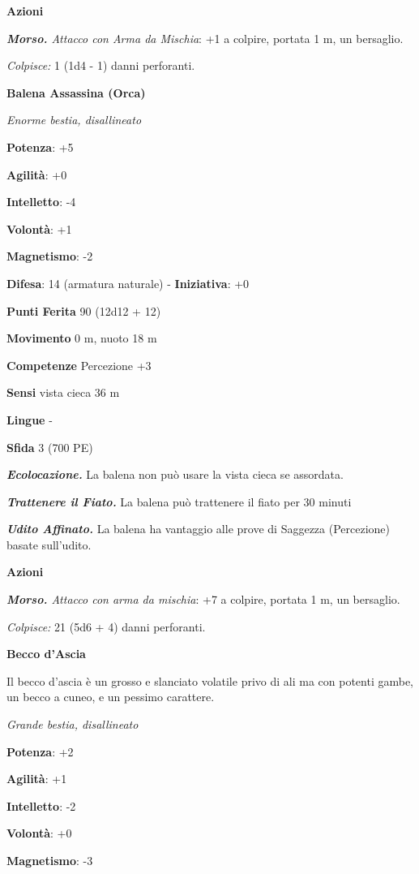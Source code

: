 \begin{multicols}{2}
\smallskip\textbf{Azioni}

\emph{\textbf{Morso.} Attacco con Arma da Mischia}: +1 a colpire,
portata 1 m, un bersaglio.

\emph{Colpisce:} 1 (1d4 - 1) danni perforanti.



\textbf{Balena Assassina (Orca)}

\emph{Enorme bestia, disallineato}

\textbf{Potenza}: +5

\textbf{Agilità}: +0

\textbf{Intelletto}: -4

\textbf{Volontà}: +1

\textbf{Magnetismo}: -2

\textbf{Difesa}: 14 (armatura naturale) - \textbf{Iniziativa}: +0

\textbf{Punti Ferita} 90 (12d12 + 12)

\textbf{Movimento} 0 m, nuoto 18 m

\textbf{Competenze} Percezione +3

\textbf{Sensi} vista cieca 36 m

\textbf{Lingue} -

\textbf{Sfida} 3 (700 PE)\smallskip

\emph{\textbf{Ecolocazione.}} La balena non può usare la vista cieca se
assordata.

\emph{\textbf{Trattenere il Fiato.}} La balena può trattenere il fiato
per 30 minuti

\emph{\textbf{Udito Affinato.}} La balena ha vantaggio alle prove di
Saggezza (Percezione) basate sull'udito.

\smallskip\textbf{Azioni}

\emph{\textbf{Morso.} Attacco con arma da mischia}: +7 a colpire,
portata 1 m, un bersaglio.

\emph{Colpisce:} 21 (5d6 + 4) danni perforanti.

\textbf{Becco d'Ascia}

Il becco d'ascia è un grosso e slanciato volatile privo di ali ma con
potenti gambe, un becco a cuneo, e un pessimo carattere.

\emph{Grande bestia, disallineato}

\textbf{Potenza}: +2

\textbf{Agilità}: +1

\textbf{Intelletto}: -2

\textbf{Volontà}: +0

\textbf{Magnetismo}: -3


\end{multicols}
